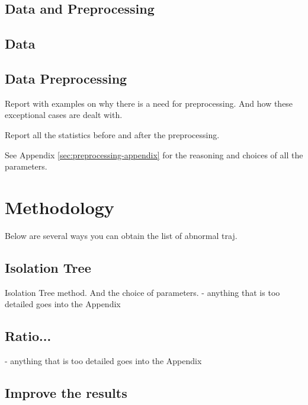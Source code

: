 \documentclass[runningheads]{llncs}
\begin{document}
\subsection{Data and Preprocessing}
\label{sec:data-preprocessing}

\subsection{Data}

\subsection{Data Preprocessing}
\label{sec:preprocessing}

Report with examples on why there is a need for preprocessing. And how these exceptional cases are dealt with. 



Report all the statistics before and after the preprocessing. 


See Appendix \ref{sec:preprocessing-appendix} for the reasoning and choices of all the parameters. 


\section{Methodology}
\label{sec:methodology}

Below are several ways you can obtain the list of abnormal traj.

\subsection{Isolation Tree}
\label{sec:iso}
Isolation Tree method. And the choice of parameters. - anything that is too detailed goes into the Appendix

\subsection{Ratio...}
- anything that is too detailed goes into the Appendix

\subsection{Improve the results}
\label{sec:improve}
\end{document}
